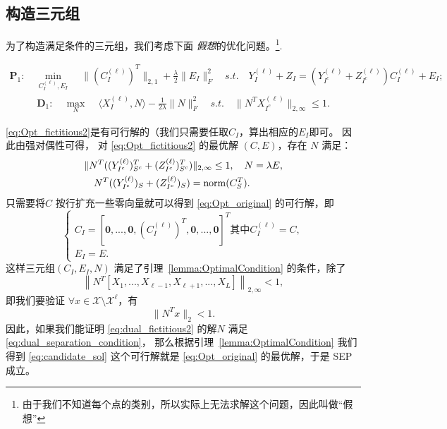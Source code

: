 \documentclass{ctexart}
\begin{document}
\subsection{构造三元组}\label{sec:construct_nu}
为了构造满足条件的三元组，我们考虑下面 {\em
假想}的优化问题。\footnote{由于我们不知道每个点的类别，所以实际上无法求解这个问题，因此叫做``假想''}.

\begin{align}\label{eq:Opt_fictitious2}
  \mathbf{P}_1: \quad \min_{C^{(\ell)}_I, E_I} \;
  &\|(C^{(\ell)}_I)^T\|_{2,1}+\frac{\lambda}{2}\|E_I\|_F^2 \quad
  s.t. \quad Y^{(\ell)}_I+Z_I=(Y^{(\ell)}_{I^c}+Z^{(\ell)}_{I^c})C^{(\ell)}_I+E_I;
\end{align}
\begin{align}\label{eq:dual_fictitious2}
  \mathbf{D}_1: \quad \max_{N} \; &\langle X_I^{(\ell)},N \rangle -
  \frac{1}{2\lambda} \|N\|_F^2 \quad
  s.t. \quad \|N^T X^{(\ell)}_{I^c}\|_{2, \infty} \leq 1.
\end{align}

\eqref{eq:Opt_fictitious2}是有可行解的（我们只需要任取$C_I$，算出相应的$E_I$即可。 因此由强对偶性可得， 
对 \eqref{eq:Opt_fictitious2} 的最优解 $(C, E)$，存在 $N$ 满足：
\begin{align*}
  &\|N^T ((Y^{(\ell)}_{I^c})_{S^{c}}^T +(Z^{(\ell)}_{I^c})_{S^{c}}^T)\|_{2, \infty}\leq 1, \quad N=\lambda E, \\
  &\quad N^T ((Y^{(\ell)}_{I^c})_{S} +(Z^{(\ell)}_{I^c})_{S}) =\mathrm{norm}(C_S^T).
\end{align*}
只需要将$C$ 按行扩充一些零向量就可以得到 \eqref{eq:Opt_original} 的可行解，即
\begin{equation}\label{eq:candidate_sol}
\begin{cases}
  C_I= [\mathbf{0},...,\mathbf{0},(C_I^{(\ell)})^T,\mathbf{0},...,\mathbf{0}]^T
  \text{其中} C_I^{(\ell)}=C,\\
    E_I= E.
\end{cases}
\end{equation}
这样三元组$(C_I, E_I, N)$ 满足了引理~\ref{lemma:OptimalCondition} 的条件，除了
\begin{equation*}
    \left\|N^T [X_1,...,X_{\ell-1},X_{\ell+1},...,X_L]\right\|_{2,\infty}<1,
\end{equation*}
即我们要验证 $\forall x \in \mathcal{X}\setminus \mathcal{X}^{\ell}$，有
\begin{equation}\label{eq:dual_separation_condition}
    \| N^T x \|_2 < 1.
\end{equation}
因此，如果我们能证明 \eqref{eq:dual_fictitious2} 的解$N$ 满足 \eqref{eq:dual_separation_condition}，
那么根据引理~\ref{lemma:OptimalCondition} 我们得到 \eqref{eq:candidate_sol}
这个可行解就是 \eqref{eq:Opt_original} 的最优解，于是 SEP 成立。
\end{document}
